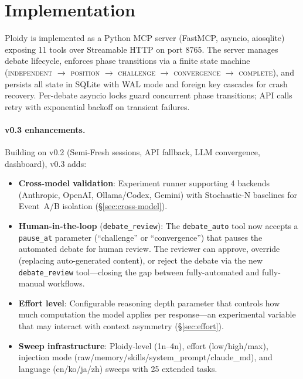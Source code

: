 \documentclass[11pt]{article}
\begin{document}
\section{Implementation}
\label{sec:implementation}

Ploidy is implemented as a Python MCP server (FastMCP, asyncio, aiosqlite) exposing 11 tools over Streamable HTTP on port 8765. The server manages debate lifecycle, enforces phase transitions via a finite state machine (\textsc{independent} $\to$ \textsc{position} $\to$ \textsc{challenge} $\to$ \textsc{convergence} $\to$ \textsc{complete}), and persists all state in SQLite with WAL mode and foreign key cascades for crash recovery. Per-debate asyncio locks guard concurrent phase transitions; API calls retry with exponential backoff on transient failures.

\paragraph{v0.3 enhancements.} Building on v0.2 (Semi-Fresh sessions, API fallback, LLM convergence, dashboard), v0.3 adds:
\begin{itemize}[leftmargin=1.5em]
  \item \textbf{Cross-model validation}: Experiment runner supporting 4 backends (Anthropic, OpenAI, Ollama/Codex, Gemini) with Stochastic-N baselines for Event~A/B isolation (\S\ref{sec:cross-model}).
  \item \textbf{Human-in-the-loop} (\texttt{debate\_review}): The \texttt{debate\_auto} tool now accepts a \texttt{pause\_at} parameter (``challenge'' or ``convergence'') that pauses the automated debate for human review. The reviewer can approve, override (replacing auto-generated content), or reject the debate via the new \texttt{debate\_review} tool---closing the gap between fully-automated and fully-manual workflows.
  \item \textbf{Effort level}: Configurable reasoning depth parameter that controls how much computation the model applies per response---an experimental variable that may interact with context asymmetry (\S\ref{sec:effort}).
  \item \textbf{Sweep infrastructure}: Ploidy-level (1n--4n), effort (low/high/max), injection mode (raw/memory/skills/system\_prompt/claude\_md), and language (en/ko/ja/zh) sweeps with 25 extended tasks.
\end{itemize}
\end{document}
